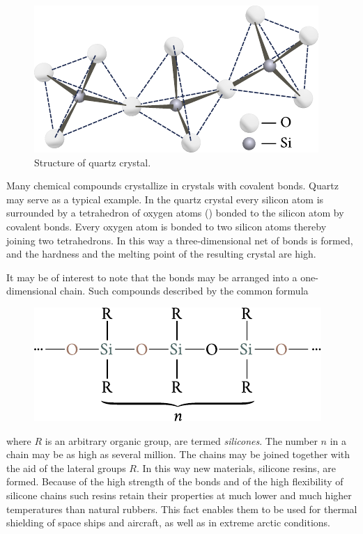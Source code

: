 \begin{figure}[t]
	\begin{center}
		\includegraphics[scale=1.0]{figures/ch_01/fig_1_20.pdf}
		\caption[]{Structure of quartz  crystal.}
		\label{fig:1_20}
	\end{center}
	\vspace{-0.7cm}
\end{figure}

Many chemical compounds crystallize in crystals with covalent bonds. Quartz  may serve as a typical example. In the quartz crystal every silicon atom is surrounded by a tetrahedron of oxygen atoms () bonded to the silicon atom by covalent bonds. Every oxygen atom is bonded to two silicon atoms thereby joining two tetrahedrons. In this way a three-dimensional net of  bonds is formed, and the hardness and the melting point of the resulting crystal are high.

It may be of interest to note that the  bonds may be arranged into a one-dimensional chain. Such compounds described by the common formula
\begin{figure}[h]
	\begin{center}
		\includegraphics[scale=0.95]{figures/ch_01/chemical_formula_quartz.pdf}
	\end{center}
	\vspace{-0.7cm}
\end{figure}

\noindent
where $R$ is an arbitrary organic group, are termed \textit{silicones}. The number $n$ in a chain may be as high as several million. The chains may be joined together with the aid of the lateral groups $R$. In this way new materials, silicone resins, are formed. Because of the high strength of the  bonds and of the high flexibility of silicone chains such resins retain their properties at much lower and much higher temperatures than natural rubbers. This fact enables them to be used for thermal shielding of space ships and aircraft, as well as in extreme arctic conditions.

